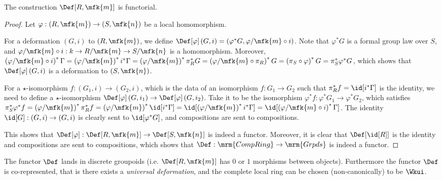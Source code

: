 \begin{proposition}[/definition]
	The construction $\Def[R, \mfk{m}]$ is functorial.
\end{proposition}

\begin{proof}
	Let $\varphi: \left(R, \mfk{m}\right) \to \left(S, \mfk{n}\right)$ be a local homomorphism.
	
	For a deformation $\left(G, i\right)$ to $\left(R, \mfk{m}\right)$, we define
	$
	\Def[\varphi]\left(G, i\right)
	= \left(\varphi^* G, \varphi/\mfk{m} \circ i\right)
	$.
	Note that $\varphi^* G$ is a formal group law over $S$, and $\varphi/\mfk{m} \circ i: k \to R/\mfk{m} \to S/\mfk{n}$ is a homomorphism.
	Moreover,
	$
	\left(\varphi/\mfk{m} \circ i\right)^* \Gamma
	= \left(\varphi/\mfk{m}\right)^* i^* \Gamma
	= \left(\varphi/\mfk{m}\right)^* \pi_R^* G
	= \left(\varphi/\mfk{m} \circ \pi_R\right)^* G
	= \left(\pi_S \circ \varphi\right)^* G
	= \pi_S^* \varphi^* G
	$,
	which shows that $\Def[\varphi]\left(G, i\right)$ is a deformation to $\left(S, \mfk{n}\right)$.
	
	For a $\star$-isomorphism $f: \left(G_1, i\right) \to \left(G_2, i\right)$, which is the data of an isomorphism $f: G_1 \to G_2$ such that $\pi_R^* f = \id[i^*\Gamma]$ is the identity, we need to define a $\star$-isomorphism $\Def[\varphi]\left(G, i_1\right) \to \Def[\varphi]\left(G, i_2\right)$.
	Take it to be the isomorphism $\varphi^* f: \varphi^* G_1 \to \varphi^* G_2$, which satisfies
	$
	\pi_S^* \varphi^* f
	= \left(\varphi/\mfk{m}\right)^* \pi_R^* f
	= \left(\varphi/\mfk{m}\right)^* \id[i^*\Gamma]
	= \id[\left(\varphi/\mfk{m}\right)^* i^*\Gamma]
	= \id[\left(\varphi/\mfk{m} \circ i \right)^*\Gamma]
	$.
	The identity $\id[G]: \left(G, i\right) \to \left(G, i\right)$ is clearly sent to $\id[\varphi^* G]$, and compositions are sent to compositions.
	
	This shows that $\Def[\varphi]: \Def[R, \mfk{m}] \to \Def[S, \mfk{n}]$ is indeed a functor.
	Moreover, it is clear that $\Def[{\id[R]}]$ is the identity and compositions are sent to compositions, which shows that $\Def: \mrm{CompRing} \to \mrm{Grpds}$ is indeed a functor.
\end{proof}

\begin{theorem}
	The functor $\Def$ lands in discrete groupoids (i.e. $\Def[R, \mfk{m}]$ has $0$ or $1$ morphisms between objects).
	Furthermore the functor $\Def$ is co-represented, that is there exists a \emph{universal deformation}, and the complete local ring can be chosen (non-canonically) to be $\Wkui$.
\end{theorem}

